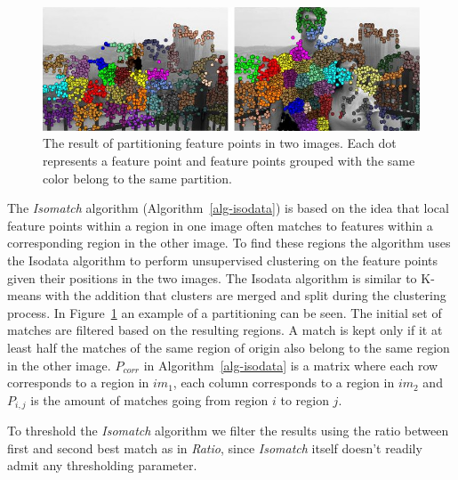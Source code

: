 \begin{figure}[htb]
	\centering
	\includegraphics[width=\columnwidth]{images/isomatch_partitions}
	\caption{The result of partitioning feature points in two images.  
	Each dot represents a feature point and feature points grouped with 
the same color belong to the same partition.}
	\label{fig:isomatch_partitions}
\end{figure}

The \emph{Isomatch} algorithm (Algorithm~\ref{alg-isodata}) 
\cite{das2008event} is based on the idea that local feature points 
within a region in one image often matches to features within a 
corresponding region in the other image. To find these regions the 
algorithm uses the Isodata algorithm \cite{ball1965isodata} to perform 
unsupervised clustering on the feature points given their positions in 
the two images. The Isodata algorithm is similar to K-means with the 
addition that clusters are merged and split during the clustering 
process. In Figure~\ref{fig:isomatch_partitions} an example of a 
partitioning can be seen. The initial set of matches are filtered based 
on the resulting regions. A match is kept only if it at least half the 
matches of the same region of origin also belong to the same region in 
the other image.  $P_{corr}$ in Algorithm~\ref{alg-isodata} is a matrix 
where each row corresponds to a region in $im_1$, each column 
corresponds to a region in $im_2$ and $P_{i,j}$ is the amount of matches 
going from region $i$ to region $j$.

To threshold the \emph{Isomatch} algorithm we filter the results using 
the ratio between first and second best match as in \emph{Ratio}, since 
\emph{Isomatch} itself doesn't readily admit any thresholding parameter.  

